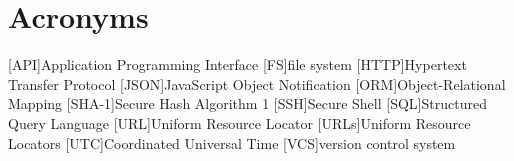 \chapter*{Acronyms}
\begin{acronym}
    [API]{Application Programming Interface}
    [FS]{file system}
    [HTTP]{Hypertext Transfer Protocol}
    [JSON]{JavaScript Object Notification}
    [ORM]{Object-Relational Mapping}
    [SHA-1]{Secure Hash Algorithm 1}
    [SSH]{Secure Shell}
    [SQL]{Structured Query Language}
    [URL]{Uniform Resource Locator}
    [URLs]{Uniform Resource Locators}
    [UTC]{Coordinated Universal Time}
    [VCS]{version control system}
\end{acronym}
